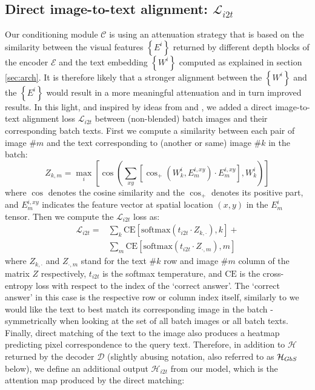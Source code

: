 \documentclass[10pt,twocolumn,letterpaper]{article}
\newcommand\secvspace{\vspace{-0.0cm}}
\begin{document}
\subsection{Direct image-to-text alignment: $\mathcal{L}_{i2t}$}\label{sec:img_text_align}
\secvspace
Our conditioning module $\mathcal{C}$ is using an attenuation strategy that is based on the similarity between the visual features $\left\{E^i\right\}$ returned by different depth blocks of the encoder $\mathcal{E}$ and the text embedding $\left\{W^i\right\}$ computed as explained in section \ref{sec:arch}. It is therefore likely that a stronger alignment between the $\left\{W^i\right\}$ and the $\left\{E^i\right\}$ would result in a more meaningful attenuation and in turn improved results. In this light, and inspired by ideas from \cite{akbari2019multi} and \cite{radford2021learning}, we added a direct image-to-text alignment loss $\mathcal{L}_{i2t}$ between (non-blended) batch images and their corresponding batch texts. First we compute a similarity between each pair of image \#$m$ and the text corresponding to (another or same) image
\#$k$ in the batch:
\begin{equation}
    Z_{k,m} = \max_{i}\left[\cos\left(\sum_{xy}\left[\cos_+\left(W_k^i, E_m^{i,xy}\right) \cdot E_m^{i,xy}\right], W_k^i\right)\right]
\end{equation}
where $\cos$ denotes the cosine similarity and the $\cos_+$ denotes its positive part,
and $E_m^{i,xy}$ indicates the feature vector at spatial location $(x,y)$ in the $E_m^i$ tensor. Then we compute the $\mathcal{L}_{i2t}$ loss as:
\begin{align}
    \mathcal{L}_{i2t} = 
    & \sum_{k} \text{CE} \left[ \text{softmax} \left( t_{i2t} \cdot Z_{k,\boldsymbol{\cdot}} \right), k \right] + \\ 
    & \sum_{m} \text{CE} \left[ \text{softmax} \left( t_{i2t} \cdot Z_{\boldsymbol{\cdot},m} \right), m \right]
\end{align}
where $Z_{k,\boldsymbol{\cdot}}$ and $Z_{\boldsymbol{\cdot},m}$ stand for the text \#$k$ row and image \#$m$ column of the matrix $Z$ respectively, $t_{i2t}$ is the softmax temperature, and $\text{CE}$ is the cross-entropy loss with respect to the index of the `correct answer'. The `correct answer' in this case is the respective row or column index itself, similarly to \cite{radford2021learning} we would like the text to best match its corresponding image in the batch - symmetrically when looking at the set of all batch images or all batch texts. Finally, direct matching of the text to the image also produces a heatmap predicting pixel correspondence to the query text. Therefore, in addition to $\mathcal{H}$ returned by the decoder $\mathcal{D}$ (slightly abusing notation, also referred to as $\mathcal{H}_{{GbS}}$ below), we define an additional output $\mathcal{H}_{i2t}$ from our model, which is the attention map produced by the direct matching:
\end{document}
